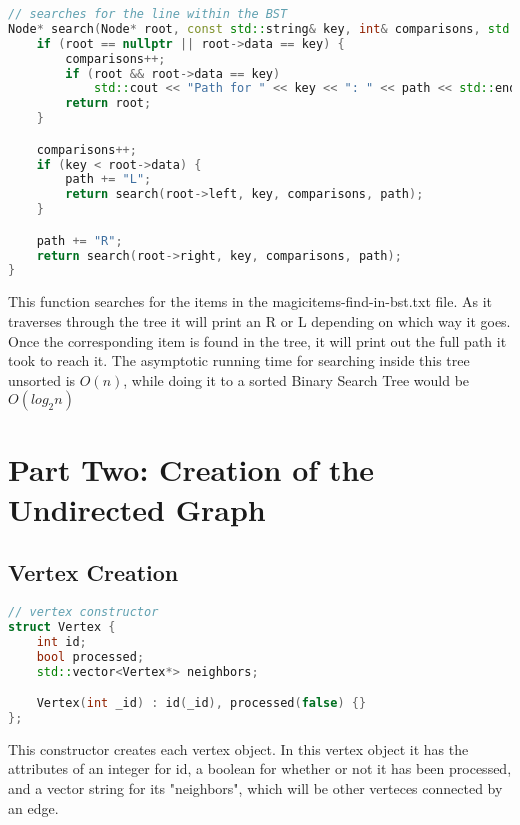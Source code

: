 \documentclass[letterpaper, 10pt,DIV=13]{scrartcl}
\numberwithin{equation}{section} %
\numberwithin{figure}{section} %
\numberwithin{table}{section} %
\begin{document}
\begin{lstlisting}[language=c++, caption= function to search through a binary tree]
// searches for the line within the BST
Node* search(Node* root, const std::string& key, int& comparisons, std::string& path) {
    if (root == nullptr || root->data == key) {
        comparisons++;
        if (root && root->data == key)
            std::cout << "Path for " << key << ": " << path << std::endl;
        return root;
    }

    comparisons++;
    if (key < root->data) {
        path += "L";
        return search(root->left, key, comparisons, path);
    }

    path += "R";
    return search(root->right, key, comparisons, path);
}
\end{lstlisting}
This function searches for the items in the magicitems-find-in-bst.txt file. As it traverses through the tree it will print an R or L depending on which way it goes. Once the corresponding item is found in the tree, it will print out the full path it took to reach it. The asymptotic running time for searching inside this tree unsorted is $O(n)$, while doing it to a sorted Binary Search Tree would be $O(log_2n)$
\section{Part Two: Creation of the Undirected Graph}
\subsection{Vertex Creation}
\begin{lstlisting}[language=c++, caption= Vertex Constructor]
// vertex constructor
struct Vertex {
    int id;
    bool processed;
    std::vector<Vertex*> neighbors;

    Vertex(int _id) : id(_id), processed(false) {}
};
\end{lstlisting}
This constructor creates each vertex object. In this vertex object it has the attributes of an integer for id, a boolean for whether or not it has been processed, and a vector string for its "neighbors", which will be other verteces connected by an edge.
\end{document}
